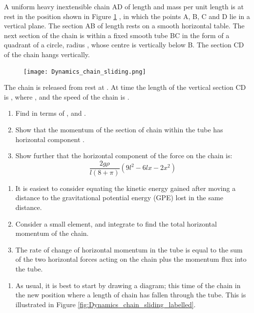 
\begin{problem}
{A uniform heavy inextensible chain AD of length  and mass \vari{\rho} per unit length is at rest in the position shown in Figure \ref{fig:Dynamics_chain_sliding} , in which the points A, B, C and D lie in a vertical plane. The section AB of length  rests on a smooth horizontal table. The next section of the chain is within a fixed smooth tube BC in the form of a quadrant of a circle, radius , whose centre  is vertically below B. The section CD of the chain hangs vertically.

\begin{figure}[h!]
\centering
\texttt{[image: Dynamics\_chain\_sliding.png]}
\caption{}\label{fig:Dynamics_chain_sliding}
\end{figure}

The chain is released from rest at . At time  the length of the vertical section CD is , where , and the speed of the chain is .
\begin{enumerate}
	\item Find  in terms of ,  and .
	\item Show that the momentum of the section of chain within the tube has horizontal component .
	\item Show further that the horizontal component of the force on the chain is:
	\begin{equation*} 
	\frac{2g \rho}{l(8 + \pi)} \left( 9l^{2} - 6lx - 2x^{2} \right) 
	\end{equation*}
\end{enumerate}
\begin{enumerate}
	\item It is easiest to consider equating the kinetic energy gained after moving a distance  to the gravitational potential energy (GPE) lost in the same distance.
	\item Consider a small element, and integrate %
to find the total horizontal momentum of the chain.%
	\item The rate of change of horizontal momentum in the tube is equal to the sum of the two horizontal forces acting on the chain plus the momentum flux into the tube. 
\end{enumerate}
}
{}
{\begin{enumerate}
	\item As usual, it is best to start by drawing a diagram; this time of the chain in the new position where a length  of chain has fallen through the tube. This is illustrated in Figure \ref{fig:Dynamics_chain_sliding_labelled}.


\end{enumerate}}
\end{problem}
